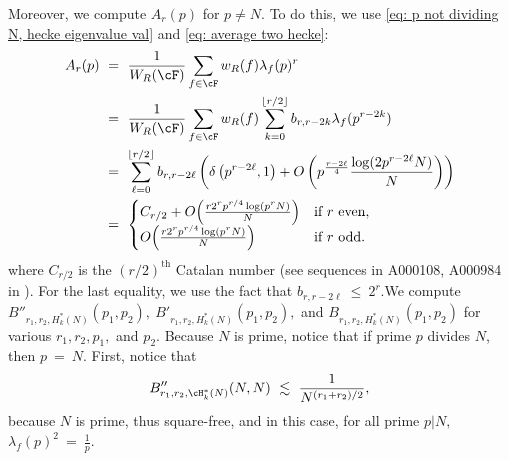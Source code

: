 \documentclass[11pt, reqno]{amsart}
\theoremstyle{definition}
\theoremstyle{remark}
\numberwithin{equation}{section}
\begin{document}
Moreover, we compute $A_r(p)$ for $p\neq N.$ To do this, we use  \eqref{eq: p not dividing N, hecke eigenvalue val} and \eqref{eq: average two hecke}: \begin{align}
    A_r(p)\ &=\ \frac{1}{W_R(\cF)} \sum_{f\in\cF} w_R(f) \lambda_f(p)^{r} \notag \\
    \ & =\ \frac{1}{W_R(\cF)} \sum_{f\in\cF} w_R(f) \sum_{k=0}^{\lfloor r/2\rfloor }b_{r,r-2k}\lambda_f(p^{r-2k}) \notag \\
   \ &=\  \sum_{\ell=0}^{\lfloor r/2\rfloor }b_{r,r-2\ell}\left(\delta\left(p^{r-2\ell},1\right)+O\left(p^\frac{r-2\ell}{4} \frac{\log(2p^{r-2\ell}N)}{N}\right)\right) \notag \\
   \ &=\ \begin{cases}
  C_{r/2} + O\!\left(\frac{r 2^r p^{r/4}\log(p^rN)}{N}\right) 
    & \text{if $r$ even}, \\[2pt]
  O\!\left(\frac{r 2^r p^{r/4}\log(p^rN)}{N}\right) 
    & \text{if $r$ odd}.
\end{cases}
\end{align} where $C_{r/2}$ is the $(r/2)^{\text{th}}$ Catalan number (see sequences in A000108, A000984 in \cite{Sl}). For the last equality, we use the fact that $b_{r,r-2\ell}\ \leq \ 2^r.$We compute $B''_{r_1,r_2,H_k^*(N)}(p_1,p_2),\ B'_{r_1,r_2, H_k^*(N)}(p_1,p_2),$ and $B_{r_1,r_2,H_k^*(N)}(p_1,p_2)$ for various $r_1,r_2,p_1,$ and $p_2.$  Because $N$ is prime, notice that if prime $p$ divides $N$, then $p\ =\ N$. First, notice that \begin{equation}
    B''_{r_1,r_2,\cH_k^*(N)}(N,N)\ \lesssim \ \frac{1}{N^{(r_1+r_2)/2}}, 
\end{equation}because $N$ is prime, thus square-free, and in this case, for all prime $p|N,$ $\lambda_f(p)^2\ =\ \frac{1}{p}.$
\end{document}
